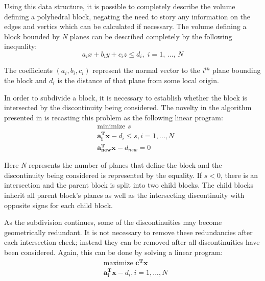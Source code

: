Using this data structure, it is possible to completely describe the volume defining a polyhedral block, negating the need to story any information on the edges and vertics which can be calculated if necessary. The volume defining a block bounded by \textit{N} planes can be described completely by the following inequality:
\begin{equation}
a_ix + b_iy + c_iz \leq d_i, \; i = 1 ,\, \ldots ,\, N
\end{equation}

The coefficients $(a_i, b_i, c_i)$ represent the normal vector to the $i^{th}$ plane bounding the block and $d_i$ is the distance of that plane from some local origin. \par
 
In order to subdivide a block, it is necessary to establish whether the block is intersected by the discontinuity being considered. The novelty in the algorithm presented in \cite{slicing} is recasting this problem as the following linear program: 
\begin{equation}
\begin{aligned} 
&\text{minimize } s\\
&\boldsymbol{a_{i}^{T} x} - d_i \leq s, i = 1,...,N\\
&\boldsymbol{a_{new}^{T} x} - d_{new} = 0
\end{aligned}
\end{equation}

Here \textit{N} represents the number of planes that define the block and the discontinuity being considered is represented by the equality. If $s < 0$, there is an intersection and the parent block is split into two child blocks. The child blocks inherit all parent block's planes as well as the intersecting discontinuity with opposite signs for each child block. \par

As the subdivision continues, some of the discontinuities may become geometrically redundant. It is not necessary to remove these redundancies after each intersection check; instead they can be removed after all discontinuities have been considered. Again, this can be done by solving a linear program: 
\begin{equation}
\begin{aligned}
&\text{maximize }\boldsymbol{c^{T} x}\\
&\boldsymbol{a_{i}^{T} x} - d_{i}, i = 1,...,N
\end{aligned}
\end{equation}

